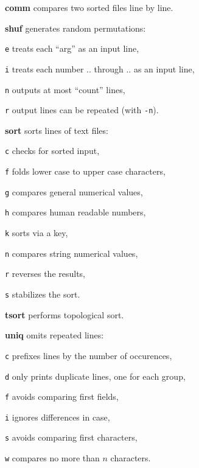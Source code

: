 \begin{enumx}
	\item [\cmdblack] \textbf{comm} compares two sorted files line by line.
	\item [\cmdblack] \textbf{shuf} generates random permutations:
	\item [\texttt{e}] treats each ``arg'' as an input line,
	\item [\texttt{i}] treats each number .. through .. as an input line, 
	\item [\texttt{n}] outputs at most ``count'' lines,
	\item [\texttt{r}] output lines can be repeated (with \texttt{-n}).
	\item [\cmdblack] \textbf{sort} sorts lines of text files:
	\item [\texttt{c}] checks for sorted input,
	\item [\texttt{f}] folds lower case to upper case characters,
	\item [\texttt{g}] compares general numerical values,
	\item [\texttt{h}] compares human readable numbers,
	\item [\texttt{k}] sorts via a key,
	\item [\texttt{n}] compares string numerical values,
	\item [\texttt{r}] reverses the results,
	\item [\texttt{s}] stabilizes the sort.
	\item [\cmdblack] \textbf{tsort} performs topological sort.
	\item [\cmdblack] \textbf{uniq} omits repeated lines:
	\item [\texttt{c}] prefixes lines by the number of occurences,
	\item [\texttt{d}] only prints duplicate lines, one for each group,
	\item [\texttt{f}] avoids comparing first fields,
	\item [\texttt{i}] ignores differences in case,
	\item [\texttt{s}] avoids comparing first characters,
	\item [\texttt{w}] compares no more than $n$ characters.
\end{enumx}

